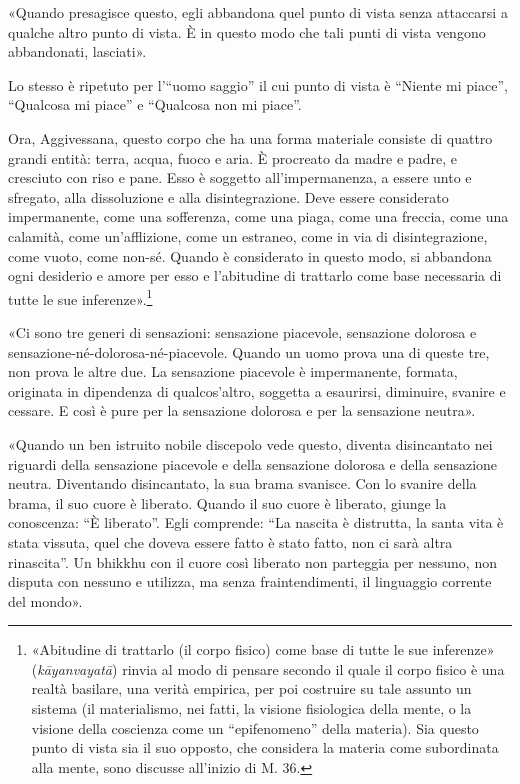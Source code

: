 «Quando presagisce questo, egli abbandona quel punto di vista senza
attaccarsi a qualche altro punto di vista. È in questo modo che tali
punti di vista vengono abbandonati, lasciati».


 Lo stesso è ripetuto per l’“uomo saggio” il cui
punto di vista è “Niente mi piace”, “Qualcosa mi piace” e “Qualcosa non
mi piace”.


 Ora, Aggivessana, questo corpo che ha una forma materiale
consiste di quattro grandi entità: terra, acqua, fuoco e aria. È
procreato da madre e padre, e cresciuto con riso e pane. Esso è soggetto
all’impermanenza, a essere unto e sfregato, alla dissoluzione e alla
disintegrazione. Deve essere considerato impermanente, come una
sofferenza, come una piaga, come una freccia, come una calamità, come
un’afflizione, come un estraneo, come in via di disintegrazione, come
vuoto, come non-sé. Quando è considerato in questo modo, si abbandona
ogni desiderio e amore per esso e l’abitudine di trattarlo come base
necessaria di tutte le sue inferenze».\footnote{«Abitudine di trattarlo (il corpo fisico) come base di tutte le sue inferenze» (\emph{kāyanvayatā}) rinvia al modo di pensare secondo il quale il corpo fisico è una realtà basilare, una verità empirica, per poi costruire su tale assunto un sistema (il materialismo, nei fatti, la visione fisiologica della mente, o la visione della coscienza come un “epifenomeno” della materia). Sia questo punto di vista sia il suo opposto, che considera la materia come subordinata alla mente, sono discusse all’inizio di M. 36.}


«Ci sono tre generi di sensazioni: sensazione piacevole, sensazione
dolorosa e sensazione-né-dolorosa-né-piacevole. Quando un uomo prova una
di queste tre, non prova le altre due. La sensazione piacevole è
impermanente, formata, originata in dipendenza di qualcos’altro,
soggetta a esaurirsi, diminuire, svanire e cessare. E così è pure per
la sensazione dolorosa e per la sensazione neutra».


«Quando un ben istruito nobile discepolo vede questo, diventa
disincantato nei riguardi della sensazione piacevole e della sensazione
dolorosa e della sensazione neutra. Diventando disincantato, la sua
brama svanisce. Con lo svanire della brama, il suo cuore è liberato.
Quando il suo cuore è liberato, giunge la conoscenza: “È liberato”. Egli
comprende: “La nascita è distrutta, la santa vita è stata vissuta, quel
che doveva essere fatto è stato fatto, non ci sarà altra rinascita”. Un
bhikkhu con il cuore così liberato non parteggia per nessuno, non
disputa con nessuno e utilizza, ma senza fraintendimenti, il linguaggio
corrente del mondo».


